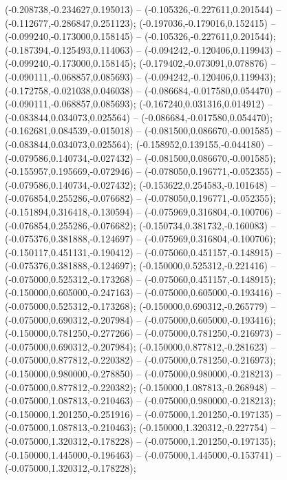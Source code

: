  (-0.208738,-0.234627,0.195013) -- (-0.105326,-0.227611,0.201544) -- (-0.112677,-0.286847,0.251123);
 (-0.197036,-0.179016,0.152415) -- (-0.099240,-0.173000,0.158145) -- (-0.105326,-0.227611,0.201544);
 (-0.187394,-0.125493,0.114063) -- (-0.094242,-0.120406,0.119943) -- (-0.099240,-0.173000,0.158145);
 (-0.179402,-0.073091,0.078876) -- (-0.090111,-0.068857,0.085693) -- (-0.094242,-0.120406,0.119943);
 (-0.172758,-0.021038,0.046038) -- (-0.086684,-0.017580,0.054470) -- (-0.090111,-0.068857,0.085693);
 (-0.167240,0.031316,0.014912) -- (-0.083844,0.034073,0.025564) -- (-0.086684,-0.017580,0.054470);
 (-0.162681,0.084539,-0.015018) -- (-0.081500,0.086670,-0.001585) -- (-0.083844,0.034073,0.025564);
 (-0.158952,0.139155,-0.044180) -- (-0.079586,0.140734,-0.027432) -- (-0.081500,0.086670,-0.001585);
 (-0.155957,0.195669,-0.072946) -- (-0.078050,0.196771,-0.052355) -- (-0.079586,0.140734,-0.027432);
 (-0.153622,0.254583,-0.101648) -- (-0.076854,0.255286,-0.076682) -- (-0.078050,0.196771,-0.052355);
 (-0.151894,0.316418,-0.130594) -- (-0.075969,0.316804,-0.100706) -- (-0.076854,0.255286,-0.076682);
 (-0.150734,0.381732,-0.160083) -- (-0.075376,0.381888,-0.124697) -- (-0.075969,0.316804,-0.100706);
 (-0.150117,0.451131,-0.190412) -- (-0.075060,0.451157,-0.148915) -- (-0.075376,0.381888,-0.124697);
 (-0.150000,0.525312,-0.221416) -- (-0.075000,0.525312,-0.173268) -- (-0.075060,0.451157,-0.148915);
 (-0.150000,0.605000,-0.247163) -- (-0.075000,0.605000,-0.193416) -- (-0.075000,0.525312,-0.173268);
 (-0.150000,0.690312,-0.265779) -- (-0.075000,0.690312,-0.207984) -- (-0.075000,0.605000,-0.193416);
 (-0.150000,0.781250,-0.277266) -- (-0.075000,0.781250,-0.216973) -- (-0.075000,0.690312,-0.207984);
 (-0.150000,0.877812,-0.281623) -- (-0.075000,0.877812,-0.220382) -- (-0.075000,0.781250,-0.216973);
 (-0.150000,0.980000,-0.278850) -- (-0.075000,0.980000,-0.218213) -- (-0.075000,0.877812,-0.220382);
 (-0.150000,1.087813,-0.268948) -- (-0.075000,1.087813,-0.210463) -- (-0.075000,0.980000,-0.218213);
 (-0.150000,1.201250,-0.251916) -- (-0.075000,1.201250,-0.197135) -- (-0.075000,1.087813,-0.210463);
 (-0.150000,1.320312,-0.227754) -- (-0.075000,1.320312,-0.178228) -- (-0.075000,1.201250,-0.197135);
 (-0.150000,1.445000,-0.196463) -- (-0.075000,1.445000,-0.153741) -- (-0.075000,1.320312,-0.178228);
